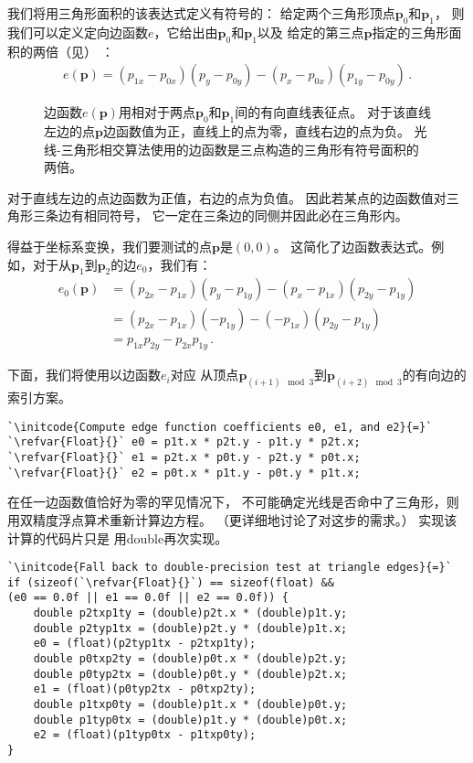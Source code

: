 我们将用三角形面积的该表达式定义有符号的：
给定两个三角形顶点$\bm p_0$和$\bm p_1$，
则我们可以定义定向边函数$e$，它给出由$\bm p_0$和$\bm p_1$以及
给定的第三点$\bm p$指定的三角形面积的两倍（见）
：
\begin{align}\label{eq:3.1}
    e(\bm p)=(p_{1x}-p_{0x})(p_y-p_{0y})-(p_x-p_{0x})(p_{1y}-p_{0y})\, .
\end{align}
\begin{figure}[htbp]
    \centering
    \caption{边函数$e(\bm p)$用相对于两点$\bm p_0$和$\bm p_1$间的有向直线表征点。
        对于该直线左边的点$\bm p$边函数值为正，直线上的点为零，直线右边的点为负。
        光线-三角形相交算法使用的边函数是三点构造的三角形有符号面积的两倍。}
    \label{fig:3.14}
\end{figure}

对于直线左边的点边函数为正值，右边的点为负值。
因此若某点的边函数值对三角形三条边有相同符号，
它一定在三条边的同侧并因此必在三角形内。

得益于坐标系变换，我们要测试的点$\bm p$是$(0,0)$。
这简化了边函数表达式。例如，对于从$\bm p_1$到$\bm p_2$的边$e_0$，我们有：
\begin{align}\label{eq:3.2}
    e_0(\bm p) & =(p_{2x}-p_{1x})(p_y-p_{1y})-(p_x-p_{1x})(p_{2y}-p_{1y})\nonumber \\
               & =(p_{2x}-p_{1x})(-p_{1y})-(-p_{1x})(p_{2y}-p_{1y})\nonumber       \\
               & =p_{1x}p_{2y}-p_{2x}p_{1y}\, .
\end{align}

下面，我们将使用以边函数$e_i$对应
从顶点$\bm p_{(i+1)\mod{3}}$到$\bm p_{(i+2)\mod{3}}$的有向边的索引方案。
\begin{lstlisting}
`\initcode{Compute edge function coefficients e0, e1, and e2}{=}`
`\refvar{Float}{}` e0 = p1t.x * p2t.y - p1t.y * p2t.x;
`\refvar{Float}{}` e1 = p2t.x * p0t.y - p2t.y * p0t.x;
`\refvar{Float}{}` e2 = p0t.x * p1t.y - p0t.y * p1t.x;
\end{lstlisting}

在任一边函数值恰好为零的罕见情况下，
不可能确定光线是否命中了三角形，则用双精度浮点算术重新计算边方程。
（更详细地讨论了对这步的需求。）
实现该计算的代码片只是
用{\ttfamily double}再次实现。
\begin{lstlisting}
`\initcode{Fall back to double-precision test at triangle edges}{=}`
if (sizeof(`\refvar{Float}{}`) == sizeof(float) &&
(e0 == 0.0f || e1 == 0.0f || e2 == 0.0f)) {
    double p2txp1ty = (double)p2t.x * (double)p1t.y;
    double p2typ1tx = (double)p2t.y * (double)p1t.x;
    e0 = (float)(p2typ1tx - p2txp1ty);
    double p0txp2ty = (double)p0t.x * (double)p2t.y;
    double p0typ2tx = (double)p0t.y * (double)p2t.x;
    e1 = (float)(p0typ2tx - p0txp2ty);
    double p1txp0ty = (double)p1t.x * (double)p0t.y;
    double p1typ0tx = (double)p1t.y * (double)p0t.x;
    e2 = (float)(p1typ0tx - p1txp0ty);
}
\end{lstlisting}

